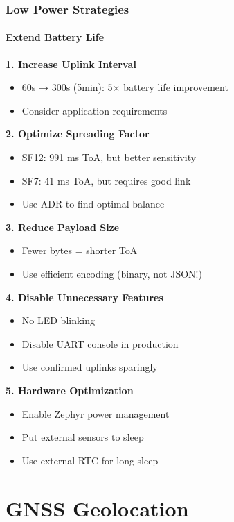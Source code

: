 \documentclass{beamer}
\begin{document}
\begin{frame}
\frametitle{Low Power Strategies}
\framesubtitle{Extend Battery Life}

\textbf{1. Increase Uplink Interval}
\begin{itemize}
    \item 60s → 300s (5min): 5× battery life improvement
    \item Consider application requirements
\end{itemize}

\textbf{2. Optimize Spreading Factor}
\begin{itemize}
    \item SF12: 991 ms ToA, but better sensitivity
    \item SF7: 41 ms ToA, but requires good link
    \item Use ADR to find optimal balance
\end{itemize}

\textbf{3. Reduce Payload Size}
\begin{itemize}
    \item Fewer bytes = shorter ToA
    \item Use efficient encoding (binary, not JSON!)
\end{itemize}

\textbf{4. Disable Unnecessary Features}
\begin{itemize}
    \item No LED blinking
    \item Disable UART console in production
    \item Use confirmed uplinks sparingly
\end{itemize}

\textbf{5. Hardware Optimization}
\begin{itemize}
    \item Enable Zephyr power management
    \item Put external sensors to sleep
    \item Use external RTC for long sleep
\end{itemize}
\end{frame}

\section{GNSS Geolocation}
\end{document}
